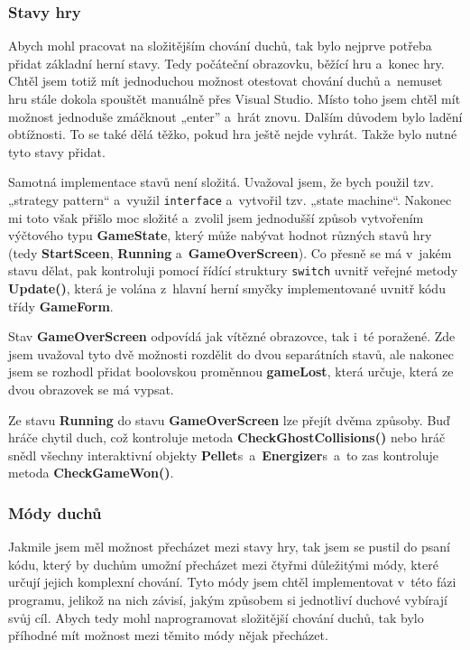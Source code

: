 \documentclass{article}
\begin{document}
\subsubsection{Stavy hry} \label{gamestates}
Abych mohl pracovat na složitějším chování duchů, tak bylo nejprve potřeba přidat základní herní stavy. Tedy počáteční obrazovku, běžící hru a~konec hry. Chtěl jsem totiž mít jednoduchou možnost otestovat chování duchů a~nemuset hru stále dokola spouštět manuálně přes Visual Studio. Místo toho jsem chtěl mít možnost jednoduše zmáčknout „enter” a~hrát znovu. Dalším důvodem bylo ladění obtížnosti. To se také dělá těžko, pokud hra ještě nejde vyhrát. Takže bylo nutné tyto stavy přidat.

Samotná implementace stavů není složitá. Uvažoval jsem, že bych použil tzv. „strategy pattern“ a~využil \verb|interface| a~vytvořil tzv. „state machine“. Nakonec mi toto však přišlo moc složité a~zvolil jsem jednodušší způsob vytvořením výčtového typu \textbf{GameState}, který může nabývat hodnot různých stavů hry (tedy \textbf{StartSceen}, \textbf{Running} a~\textbf{GameOverScreen}). Co přesně se má v~jakém stavu dělat, pak kontroluji pomocí řídící struktury \verb|switch| uvnitř veřejné metody \textbf{Update()}, která je volána z~hlavní herní smyčky implementované uvnitř kódu třídy \textbf{GameForm}. 

Stav \textbf{GameOverScreen} odpovídá jak vítězné obrazovce, tak i~té poražené. Zde jsem uvažoval tyto dvě možnosti rozdělit do dvou separátních stavů, ale nakonec jsem se rozhodl přidat boolovskou proměnnou \textbf{gameLost}, která určuje, která ze dvou obrazovek se má vypsat.

Ze stavu \textbf{Running} do stavu \textbf{GameOverScreen} lze přejít dvěma způsoby. Buď hráče chytil duch, což kontroluje metoda \textbf{CheckGhostCollisions()} nebo hráč snědl všechny interaktivní objekty \textbf{Pellet}s~a~\textbf{Energizer}s~a~to zas kontroluje metoda \textbf{CheckGameWon()}.

\subsubsection{Módy duchů} \label{generalmodes}
Jakmile jsem měl možnost přecházet mezi stavy hry, tak jsem se pustil do psaní kódu, který by duchům umožní přecházet mezi čtyřmi důležitými módy, které určují jejich komplexní chování. Tyto módy jsem chtěl implementovat v~této fázi programu, jelikož na nich závisí, jakým způsobem si jednotliví duchové vybírají svůj cíl. Abych tedy mohl naprogramovat složitější chování duchů, tak bylo příhodné mít možnost mezi těmito módy nějak přecházet.
\end{document}
